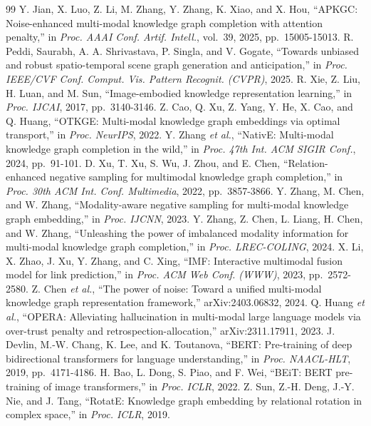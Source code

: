 \documentclass[conference,a4paper]{IEEEtran}
\begin{document}
\balance
\begin{thebibliography}{99}
 Y. Jian, X. Luo, Z. Li, M. Zhang, Y. Zhang, K. Xiao, and X. Hou, ``APKGC: Noise-enhanced multi-modal knowledge graph completion with attention penalty,'' in \emph{Proc. AAAI Conf. Artif. Intell.}, vol.~39, 2025, pp.~15005-15013.
 R. Peddi, Saurabh, A. A. Shrivastava, P. Singla, and V. Gogate, ``Towards unbiased and robust spatio-temporal scene graph generation and anticipation,'' in \emph{Proc. IEEE/CVF Conf. Comput. Vis. Pattern Recognit. (CVPR)}, 2025.
 R. Xie, Z. Liu, H. Luan, and M. Sun, ``Image-embodied knowledge representation learning,'' in \emph{Proc. IJCAI}, 2017, pp.~3140-3146.
 Z. Cao, Q. Xu, Z. Yang, Y. He, X. Cao, and Q. Huang, ``OTKGE: Multi-modal knowledge graph embeddings via optimal transport,'' in \emph{Proc. NeurIPS}, 2022.
 Y. Zhang \emph{et al.}, ``NativE: Multi-modal knowledge graph completion in the wild,'' in \emph{Proc. 47th Int. ACM SIGIR Conf.}, 2024, pp.~91-101.
 D. Xu, T. Xu, S. Wu, J. Zhou, and E. Chen, ``Relation-enhanced negative sampling for multimodal knowledge graph completion,'' in \emph{Proc. 30th ACM Int. Conf. Multimedia}, 2022, pp.~3857-3866.
 Y. Zhang, M. Chen, and W. Zhang, ``Modality-aware negative sampling for multi-modal knowledge graph embedding,'' in \emph{Proc. IJCNN}, 2023.
 Y. Zhang, Z. Chen, L. Liang, H. Chen, and W. Zhang, ``Unleashing the power of imbalanced modality information for multi-modal knowledge graph completion,'' in \emph{Proc. LREC-COLING}, 2024.
 X. Li, X. Zhao, J. Xu, Y. Zhang, and C. Xing, ``IMF: Interactive multimodal fusion model for link prediction,'' in \emph{Proc. ACM Web Conf. (WWW)}, 2023, pp.~2572-2580.
 Z. Chen \emph{et al.}, ``The power of noise: Toward a unified multi-modal knowledge graph representation framework,'' arXiv:2403.06832, 2024.
 Q. Huang \emph{et al.}, ``OPERA: Alleviating hallucination in multi-modal large language models via over-trust penalty and retrospection-allocation,'' arXiv:2311.17911, 2023.
 J. Devlin, M.-W. Chang, K. Lee, and K. Toutanova, ``BERT: Pre-training of deep bidirectional transformers for language understanding,'' in \emph{Proc. NAACL-HLT}, 2019, pp.~4171-4186.
 H. Bao, L. Dong, S. Piao, and F. Wei, ``BEiT: BERT pre-training of image transformers,'' in \emph{Proc. ICLR}, 2022.
 Z. Sun, Z.-H. Deng, J.-Y. Nie, and J. Tang, ``RotatE: Knowledge graph embedding by relational rotation in complex space,'' in \emph{Proc. ICLR}, 2019.

\end{thebibliography}
\end{document}
